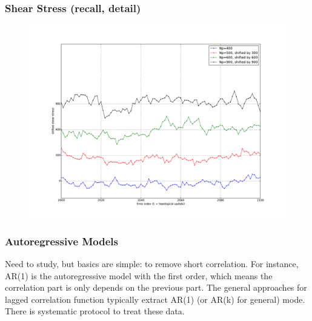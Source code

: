\documentclass[slidestop, compress, mathserif]{beamer}
\begin{document}
\begin{frame}
  \frametitle<presentation>{Shear Stress (recall, detail)}
  \begin{figure}
    \centering
    \includegraphics[height=0.8\textheight]{../tmp_shear_detail.pdf}
  \end{figure}
\end{frame}

\begin{frame}
  \frametitle<presentation>{Autoregressive Models}
  Need to study, but basics are simple: to remove short correlation. For instance, AR(1) is the autoregressive model with the first order, which means the correlation part is only depends on the previous part. The general approaches for lagged correlation function typically extract AR(1) (or AR(k) for general) mode. There is systematic protocol to treat these data.
\end{frame}


\end{document}
